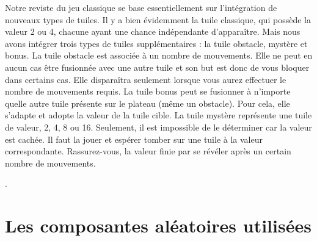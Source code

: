 \documentclass[a4paper, 12pt]{report}
\begin{document}
\tabto{1cm}Notre reviste du jeu classique se base essentiellement sur l'intégration de nouveaux types de tuiles.
\tabto{1cm}Il y a bien évidemment la tuile classique, qui possède la valeur 2 ou 4, chacune ayant une chance indépendante d'apparaître.
Mais nous avons intégrer trois types de tuiles supplémentaires : la tuile obstacle, mystère et bonus.
\tabto{1cm}La tuile obstacle est associée à un nombre de mouvements. Elle ne peut en aucun cas être fusionnée avec une autre tuile et son but est donc 
de vous bloquer dans certains cas. Elle disparaîtra seulement lorsque vous aurez effectuer le nombre de mouvements requis.
\tabto{1cm}La tuile bonus peut se fusionner à n'importe quelle autre tuile présente sur le plateau (même un obstacle). Pour cela, elle s'adapte et adopte la valeur
de la tuile cible.
\tabto{1cm}La tuile mystère représente une tuile de valeur, 2, 4, 8 ou 16. Seulement, il est impossible de le déterminer car la valeur est cachée.
Il faut la jouer et espérer tomber sur une tuile à la valeur correspondante. Rassurez-vous, la valeur finie par se révéler après un certain nombre de mouvements.

\vspace{0.5cm}

\tabto{1cm}.

\chapter{Les composantes aléatoires utilisées}
\end{document}
